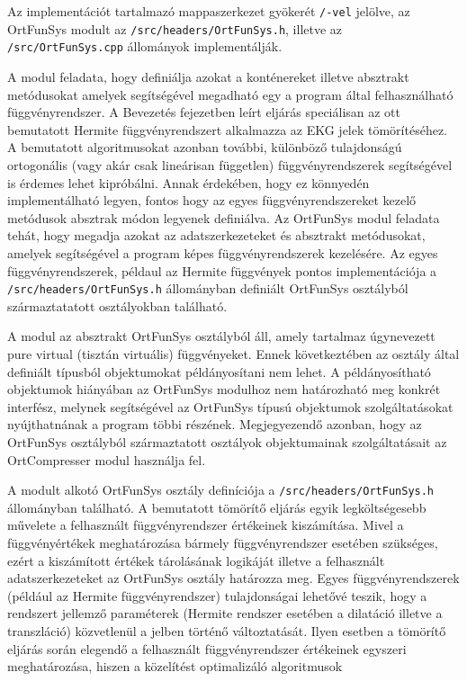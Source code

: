 \documentclass[oneside,titlepage,12pt,a4paper]{report}
\begin{document}
Az implementációt tartalmazó mappaszerkezet gyökerét \texttt{/-vel} jelölve, az OrtFunSys modult  az \texttt{/src/headers/OrtFunSys.h}, illetve az \texttt{/src/OrtFunSys.cpp} állományok implementálják. \par A modul feladata, hogy definiálja azokat a konténereket illetve absztrakt metódusokat amelyek segítségével 
megadható egy a program által felhasználható függvényrendszer. A Bevezetés fejezetben leírt eljárás speciálisan az ott bemutatott Hermite függvényrendszert 
alkalmazza az EKG jelek tömörítéséhez. A bemutatott algoritmusokat azonban további, különböző tulajdonságú ortogonális (vagy akár csak lineárisan független) 
függvényrendszerek segítségével is érdemes lehet kipróbálni. Annak érdekében, hogy ez könnyedén implementálható legyen, fontos hogy az egyes függvényrendszereket kezelő metódusok absztrak módon legyenek definiálva.
Az OrtFunSys modul feladata tehát, hogy megadja azokat az adatszerkezeteket és absztrakt metódusokat, amelyek segítségével a program képes függvényrendszerek kezelésére. Az egyes függvényrendszerek, példaul az Hermite függvények pontos implementációja
a \texttt{/src/headers/OrtFunSys.h} állományban definiált OrtFunSys osztályból származtatatott osztályokban található.  \par
A modul az absztrakt OrtFunSys osztályból áll, amely tartalmaz úgynevezett pure virtual (tisztán virtuális) függvényeket. Ennek következtében az osztály által definiált típusból objektumokat példányosítani nem lehet. A példányosítható objektumok hiányában
az OrtFunSys modulhoz nem határozható meg konkrét interfész, melynek segítségével az OrtFunSys típusú objektumok szolgáltatásokat nyújthatnának a program többi részének. Megjegyezendő azonban, hogy az OrtFunSys osztályból származtatott osztályok objektumainak szolgáltatásait az OrtCompresser
modul használja fel. 
\par  
A modult alkotó OrtFunSys osztály definíciója a \texttt{/src/headers/OrtFunSys.h} állományban található. A bemutatott tömörítő eljárás egyik legköltségesebb művelete
a felhasznált függvényrendszer értékeinek kiszámítása. Mivel a függvényértékek meghatározása bármely függvényrendszer esetében szükséges, ezért a kiszámított értékek
tárolásának logikáját illetve a felhasznált adatszerkezeteket az OrtFunSys osztály határozza meg. Egyes függvényrendszerek (például az Hermite függvényrendszer) tulajdonságai
lehetővé teszik, hogy a rendszert jellemző paraméterek (Hermite rendszer esetében a dilatáció illetve a transzláció) közvetlenül a jelben történő változtatását. 
Ilyen esetben a tömörítő eljárás során elegendő a felhasznált függvényrendszer értékeinek egyszeri meghatározása, hiszen a közelítést optimalizáló algoritmusok 
\end{document}
